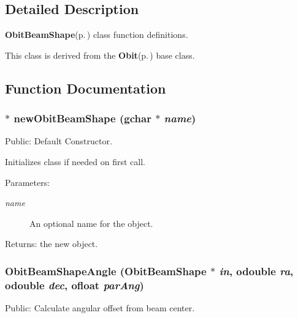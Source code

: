 \subsection{Detailed Description}
{\bf Obit\-Beam\-Shape}{\rm (p.\,\pageref{structObitBeamShape})} class function definitions. 

This class is derived from the {\bf Obit}{\rm (p.\,\pageref{structObit})} base class.

\subsection{Function Documentation}
\subsubsection{$\ast$ new\-Obit\-Beam\-Shape (gchar $\ast$ {\em name})}\label{ObitBeamShape_8c_a6}


Public: Default Constructor. 

Initializes class if needed on first call. \begin{Desc}
\item[Parameters:]
\begin{description}
\item[{\em name}]An optional name for the object. \end{description}
\end{Desc}
\begin{Desc}
\item[Returns:]the new object. \end{Desc}
\subsubsection{ Obit\-Beam\-Shape\-Angle ({\bf Obit\-Beam\-Shape} $\ast$ {\em in}, {\bf odouble} {\em ra}, {\bf odouble} {\em dec}, {\bf ofloat} {\em par\-Ang})}\label{ObitBeamShape_8c_a13}


Public: Calculate angular offset from beam center. 

